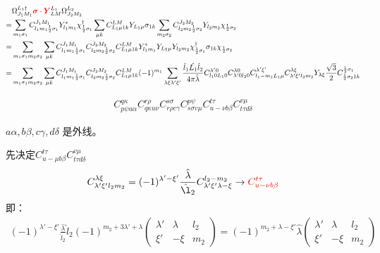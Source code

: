 \documentclass[a4paper]{article}
\newcommand{\no}{\nonumber}
\newcommand{\red}{\color{red}}
\newcommand{\bmm}[1]{{\color{red}\bm{#1}}}
\begin{document}
\begin{align}
\no&\Omega_{J_{1}M_{1}}^{L_{1}\dag}\bmm{\sigma}\cdot\bmm{Y}_{LM}^{L_{1}}\Omega_{J_{2}M_{2}}^{L_{2}}\\
\no=&\sum_{m_{1}\sigma_{1}}C_{l_{1}m_{1}\frac{1}{2}\sigma_{1}}^{J_{1}M_{1}}Y_{l_{1}m_{1}}^{*}\chi_{\frac{1}{2}\sigma_{1}}^{\dag}\sum_{\mu k}C_{L_{1}\mu1 k}^{LM}Y_{L_{1}\mu}\sigma_{1k}\sum_{m_{2}\sigma_{2}}C_{l_{2}m_{2}\frac{1}{2}\sigma_{2}}^{J_{2}M_{2}}Y_{l_{2}m_{2}}\chi_{\frac{1}{2}\sigma_{2}}\\
\no=&\sum_{m_{1}\sigma_{1}m_{2}\sigma_{2}}\sum_{\mu k}C_{l_{1}m_{1}\frac{1}{2}\sigma_{1}}^{J_{1}M_{1}}C_{l_{2}m_{2}\frac{1}{2}\sigma_{2}}^{J_{2}M_{2}}C_{L_{1}\mu1k}^{LM}Y_{l_{1}m_{1}}^{*}Y_{L_{1}\mu}Y_{l_{2}m_{2}}\chi_{\frac{1}{2}\sigma_{1}}^{\dag}\sigma_{1k}\chi_{\frac{1}{2}\sigma_{2}}\\
\no=&\sum_{m_{1}\sigma_{1}m_{2}\sigma_{2}}\sum_{\mu k}C_{l_{1}m_{1}\frac{1}{2}\sigma_{1}}^{J_{1}M_{1}}C_{l_{2}m_{2}\frac{1}{2}\sigma_{2}}^{J_{2}M_{2}}C_{L_{1}\mu1k}^{LM}(-1)^{m_{1}}\sum_{\lambda\xi\lambda'\xi'}\frac{\hat{l}_{1}\hat{L_{1}}\hat{l}_{2}}{4\pi\hat{\lambda}}C_{l_{1}0L_{1}0}^{\lambda'0}C_{\lambda'0l_{2}0}^{\lambda0}C_{l_{1}-m_{1}L_{1}\mu}^{\lambda'\xi'}C_{\lambda'\xi'l_{2}m_{2}}^{\lambda\xi}Y_{\lambda\xi}\frac{\sqrt{3}}{2}C_{\frac{1}{2}\sigma_{2}1k}^{\frac{1}{2}\sigma_{1}}
\end{align}


\begin{align}
C_{p\psi a\alpha}^{q\kappa}C_{q\kappa u\nu}^{r\rho}C_{r\rho c\gamma}^{s\sigma}C_{s\sigma v\mu}^{p\psi}C_{u-\nu b\beta}^{t\tau}C_{t\tau d\delta}^{v\mu}
\end{align}

$a\alpha,b\beta,c\gamma,d\delta$ 是外线。

先决定$C_{u-\mu b\beta}^{t\tau}C_{t\tau d\delta}^{v \mu}$
\begin{align}
C_{\lambda'\xi'l_{2}m_{2}}^{\lambda\xi}=(-1)^{\lambda'-\xi'}\frac{\hat{\lambda}}{\hat{\l}_{2}}C_{\lambda'\xi'\lambda-\xi}^{l_{2}-m_{2}}\rightarrow {\red C_{u-\nu b\beta}^{t\tau}}
\end{align}
即：
\begin{align}
(-1)^{\lambda'-\xi'}\frac{\hat{\lambda}}{\hat{l}_{2}}\hat{l}_{2}(-1)^{m_{2}+3\lambda'+\lambda}\left(\begin{array}{ccc}\lambda'&\lambda&l_{2}\\ \xi'&-\xi&m_{2}\end{array}\right)=(-1)^{m_{2}+\lambda-\xi'}\hat{\lambda}\left(\begin{array}{ccc}\lambda'&\lambda&l_{2}\\ \xi'&-\xi&m_{2}\end{array}\right)
\end{align}
\end{document}
